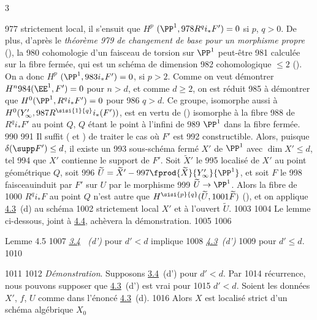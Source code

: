 3	\documentclass[10pt]{../fichiers-configuration-latex/smfart}
\begin{document}
   977	strictement local, il s'ensuit que $H^{p}$ $(\PP^{1},
   978	R^{q}i_{\ast}F')=0$ si $p$, $q>0$. De plus, d'après le \emph{théorème
   979	de changement de base pour un morphisme propre} (), la
   980	cohomologie d'un faisceau de torsion sur $\PP^{1}$ peut-être
   981	calculée sur la fibre fermée, qui est un schéma de dimension
   982	cohomologique $\leq 2$ (). On a donc $H^{p}$ $(\PP^{1},
   983	i_{\ast}F')=0$, si $p>2$. Comme on veut démontrer $H^{n}
   984	(\EE^{1},F')=0$ pour $n>d$, et comme $d\geq 2$, on est réduit
   985	à démontrer que $H^{0} (\PP^{1}, R^{q}i_{\ast}F')=0$ pour
   986	$q>d$. Ce groupe, isomorphe aussi à $H^{0} (Y'_{\infty},
   987	R^{\sisi{1}{q}}i_{\ast}(F'))$, est en vertu de () isomorphe à la fibre
   988	de $R^{q}i_{\ast}F'$ au point $Q$, $Q$ étant le point à l'infini de
   989	$\PP^{1}$ dans la fibre fermée.
   990	
   991	Il suffit ( et ) de traiter le cas où $F'$ est
   992	constructible. Alors, puisque $\delta(\supp F')\leq d$, il existe un
   993	sous-schéma fermé $X'$ de $\PP^{1}$ avec $\dim X'\leq d$, tel
   994	que $X'$ contienne le support de $F'$. Soit $\widetilde{X}'$ le
   995	localisé de $X'$ au point géométrique $Q$, soit
   996	$\widetilde{U}=\widetilde{X}'-
   997	\fprod{\widetilde{X}}{Y'_{\infty}}{\PP^{1}}$, et soit $F$ le
   998	faisceau\pageoriginale induit par $F'$ sur $U$ par le morphisme
   999	$\widetilde{U}\rightarrow \PP^{1}$. Alors la fibre de
  1000	$R^{q}i_{\ast}F$ au point $Q$ n'est autre que $H^{\sisi{p}{q}}(\widetilde{U},
  1001	\widetilde{F})$ (), et on applique \hyperref[XIV.enon4.3]{4.3}~(d) au schéma
  1002	strictement local $X'$ et à l'ouvert $\widetilde{U}$.
  1003	
  1004	Le lemme ci-dessous, joint à \hyperref[XIV.lem4.4]{4.4}, achèvera la démonstration.
  1005	
  1006	\begin{enonce*}{Lemme 4.5}
  1007	\emph{\hyperref[XIV.cor3.4]{3.4}~ (d')} pour $d'<d$ implique
  1008	\emph{\hyperref[XIV.enon4.3]{4.3}~(d')} 
  1009	pour $d'\leq d$.
  1010	\end{enonce*}
  1011	
  1012		\emph{Démonstration}. Supposons \hyperref[XIV.cor3.4]{3.4}~(d') pour $d'<d$. Par
  1014	récurrence, nous pouvons supposer que \hyperref[XIV.enon4.3]{4.3}~(d') est vrai pour
  1015	$d'<d$. Soient les données $X'$, $f$, $U$ comme dans l'énoncé \hyperref[XIV.enon4.3]{4.3}~(d). 
  1016	Alors $X$ est localisé strict d'un schéma algébrique $X_{0}$
\end{document}
